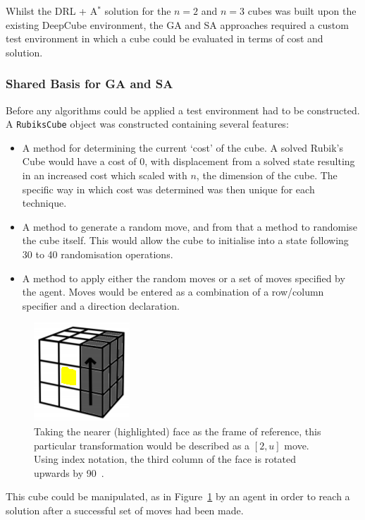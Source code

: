 \documentclass[UKenglish]{libraries/svproc}
\begin{document}
Whilst the DRL + A$^{\ast}$ solution for the $n=2$ and $n=3$ cubes was built upon the existing DeepCube environment, the GA and SA approaches required a custom test environment in which a cube could be evaluated in terms of cost and solution.

\subsubsection{Shared Basis for GA and SA}
Before any algorithms could be applied a test environment had to be constructed. A \verb|RubiksCube| object was constructed containing several features:
\begin{itemize}
    \item A method for determining the current `cost' of the cube. A solved Rubik's Cube would have a cost of 0, with displacement from a solved state resulting in an increased cost which scaled with $n$, the dimension of the cube. The specific way in which cost was determined was then unique for each technique.
    \item A method to generate a random move, and from that a method to randomise the cube itself. This would allow the cube to initialise into a state following 30 to 40 randomisation operations.
    \item A method to apply either the random moves or a set of moves specified by the agent. Moves would be entered as a combination of a row/column specifier and a direction declaration.
\end{itemize}

\begin{figure}
\centering
\includegraphics[width=0.2\linewidth]{images/move_3u.png}
\caption{Taking the nearer (highlighted) face as the frame of reference, this particular transformation would be described as a $[2,u]$ move. Using index notation, the third column of the face is rotated upwards by 90\textdegree~\cite{proj_l.hoang}.}
\label{fig:fig2}
\end{figure}

This cube could be manipulated, as in Figure~\ref{fig:fig2} by an agent in order to reach a solution after a successful set of moves had been made.
\end{document}
